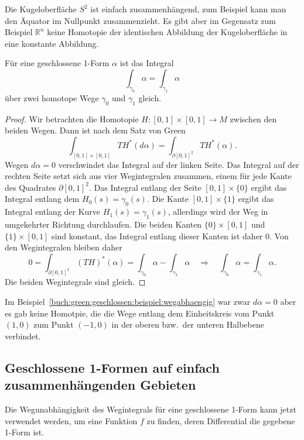 Die Kugeloberfläche $S^2$ ist einfach zusammenhängend, zum Beispiel
kann man den Äquator im Nullpunkt zusammenzieht.
Es gibt aber im Gegensatz zum Beispiel $\mathbb{R}^n$ keine Homotopie
der identischen Abbildung der Kugeloberfläche in eine konstante
Abbildung.

\begin{satz}
\label{buch:green:geschlossen:satz:wegunabhaengig}
Für eine geschlossene 1-Form $\alpha$ ist das Integral
\[
\int_{\gamma_0}\alpha = \int_{\gamma_1} \alpha
\]
über zwei homotope Wege $\gamma_0$ und $\gamma_1$ gleich.
\end{satz}

\begin{proof}
Wir betrachten die Homotopie $H:[0,1]\times[0,1]\to M$ zwischen
den beiden Wegen.
Dann ist nach dem Satz von Green
\[
\int_{[0,1]\times[0,1]}
TH^*(d\alpha)
=
\int_{\partial [0,1]^2} TH^*(\alpha).
\]
Wegen $d\alpha=0$ verschwindet das Integral auf der linken Seite.
Das Integral auf der rechten Seite setzt sich aus vier Wegintegralen
zusammen, einem für jede Kante des Quadrates $\partial[0,1]^2$.
Das Integral entlang der Seite $[0,1]\times\{0\}$ ergibt das Integral
entlang dem $H_0(s) = \gamma_0(s)$.
Die Kante $[0,1]\times\{1\}$ ergibt das Integral entlang der
Kurve $H_1(s) = \gamma_1(s)$, allerdings wird der Weg in umgekehrter
Richtung durchlaufen.
Die beiden Kanten $\{0\}\times[0,1]$ und $\{1\}\times[0,1]$ sind
konstant, das Integral entlang dieser Kanten ist daher $0$.
Von den Wegintegralen bleiben daher
\[
0
=
\int_{\partial[0,1]^2} (TH)^*(\alpha)
=
\int_{\gamma_0} \alpha
-
\int_{\gamma_1} \alpha
\quad\Rightarrow\quad
\int_{\gamma_0} \alpha
=
\int_{\gamma_1} \alpha.
\]
Die beiden Wegintegrale sind gleich.
\end{proof}

Im Beispiel~\ref{buch:green:geschlossen:beispiel:wegabhaengig}
war zwar $d\alpha=0$ aber es gab keine Homotpie, die die Wege
entlang dem Einheitskreis vom Punkt $(1,0)$ zum Punkt $(-1,0)$
in der oberen bzw.~der unteren Halbebene verbindet.

%
%
\subsection{Geschlossene 1-Formen auf einfach zusammenhängenden Gebieten}
Die Wegunabhängigkeit des Wegintegrals für eine geschlossene 1-Form
kann jetzt verwendet werden, um eine Funktion $f$ zu finden, deren
Differential die gegebene 1-Form ist.

